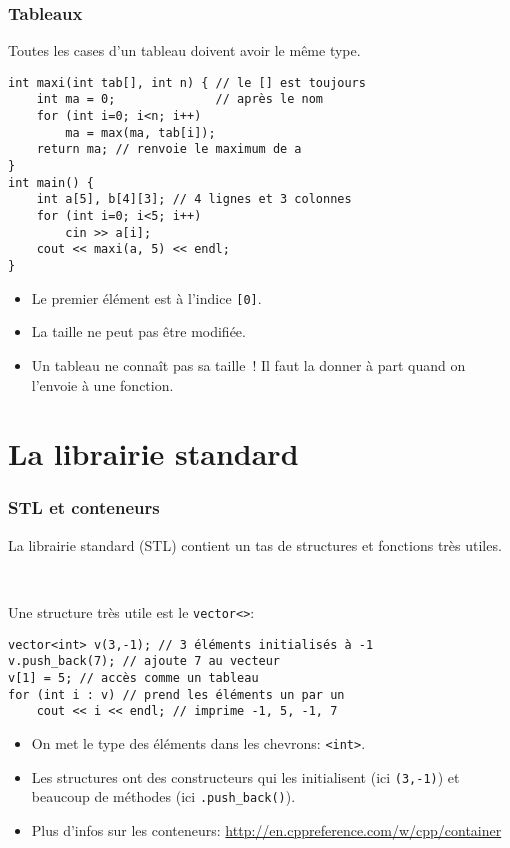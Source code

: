 \documentclass[12pt]{beamer}
\begin{document}
\begin{frame}[fragile]
\frametitle{Tableaux}
Toutes les cases d'un tableau doivent avoir le même type.
\begin{lstlisting}
int maxi(int tab[], int n) { // le [] est toujours
    int ma = 0;              // après le nom
    for (int i=0; i<n; i++)
        ma = max(ma, tab[i]);
    return ma; // renvoie le maximum de a
}
int main() {
    int a[5], b[4][3]; // 4 lignes et 3 colonnes
    for (int i=0; i<5; i++)
        cin >> a[i];
    cout << maxi(a, 5) << endl;
}
\end{lstlisting}
\begin{itemize}
\item Le premier élément est à l'indice \lstinline|[0]|.
\item La taille ne peut pas être modifiée.
\item Un tableau ne connaît pas sa taille ! Il faut la donner à part quand on l'envoie à une fonction.
\end{itemize}
\end{frame}

\section{La librairie standard}

\begin{frame}[fragile]
\frametitle{STL et conteneurs}
La librairie standard (STL) contient un tas de structures et fonctions très utiles.

~

Une structure très utile est le \lstinline|vector<>|:
\begin{lstlisting}
vector<int> v(3,-1); // 3 éléments initialisés à -1
v.push_back(7); // ajoute 7 au vecteur
v[1] = 5; // accès comme un tableau
for (int i : v) // prend les éléments un par un
    cout << i << endl; // imprime -1, 5, -1, 7
\end{lstlisting}
\begin{itemize}
\item On met le type des éléments dans les chevrons: \lstinline|<int>|.
\item Les structures ont des constructeurs qui les initialisent (ici \lstinline|(3,-1)|) et beaucoup de méthodes (ici \lstinline|.push_back()|).
\item Plus d'infos sur les conteneurs: \url{http://en.cppreference.com/w/cpp/container}
\end{itemize}
\end{frame}
\end{document}
